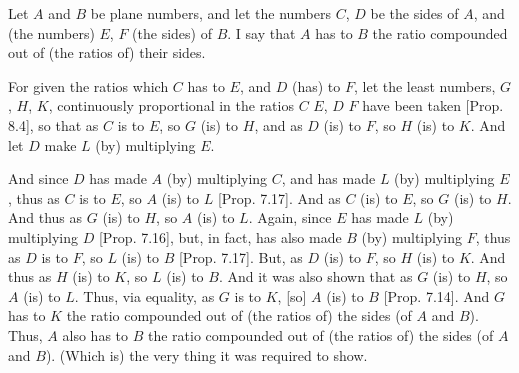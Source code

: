 \begin{Parallel}{}{}
{Let $A$ and $B$ be plane numbers, and let the numbers $C$, $D$ be the
sides of $A$, and (the numbers) $E$, $F$ (the sides) of $B$. I say that $A$ has to $B$ the ratio compounded out of (the ratios of)  their sides.

For given the ratios which $C$ has to $E$, and $D$ (has) to $F$, let the least numbers, $G$, $H$, $K$, continuously proportional in the
ratios $C$ $E$, $D$ $F$ have been taken [Prop. 8.4], so that as $C$ is to $E$, so
$G$ (is) to $H$, and as $D$ (is) to $F$, so $H$ (is) to $K$. And let $D$ make $L$ (by) multiplying $E$. 

And since $D$ has made $A$ (by) multiplying $C$, and has made $L$ (by)
multiplying $E$, thus as $C$ is to  $E$, so $A$ (is) to $L$ [Prop. 7.17]. And as $C$ (is) to $E$, so $G$ (is) to
$H$. And thus as $G$ (is) to $H$, so $A$ (is) to $L$. Again, since
$E$ has made $L$ (by) multiplying $D$ [Prop. 7.16],
but, in fact, has also made $B$ (by) multiplying $F$, thus as $D$ is to 
$F$, so $L$ (is) to $B$  [Prop. 7.17]. But,
as $D$ (is) to $F$, so $H$ (is) to $K$.  And thus as $H$ (is) to $K$, so
$L$ (is) to $B$. And it was also shown that as $G$ (is) to $H$, so $A$ (is)
to $L$. Thus, via equality, as $G$ is to $K$, [so] $A$ (is) to $B$ [Prop. 7.14]. 
And $G$ has to $K$ the ratio compounded out of (the ratios
of) the sides (of $A$ and $B$). Thus, $A$ also has to $B$ the ratio
compounded out of (the ratios of) the sides (of $A$ and $B$). (Which is)
the very thing it was required to show.}
\end{Parallel}



